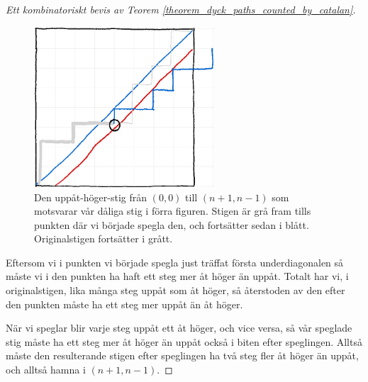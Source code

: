 \documentclass[nobib]{tufte-handout}
\begin{document}
\begin{proof}[Ett kombinatoriskt bevis av Teorem \ref{theorem_dyck_paths_counted_by_catalan}]
    \begin{figure}\label{fig:dyck_comb_proof_reflected_path}
        \centering
        \includegraphics[width = 0.6\textwidth]{graphics/dyck_combinatorial_proof_reflected_path.png}
        \caption{Den uppåt-höger-stig från $(0,0)$ till $(n+1,n-1)$ som motsvarar vår dåliga stig i förra figuren. Stigen är grå fram tills punkten där vi började spegla den, och fortsätter sedan i blått. Originalstigen fortsätter i grått.}
    \end{figure}

    Eftersom vi i punkten vi började spegla just träffat första underdiagonalen så måste vi i den punkten ha haft ett steg mer åt höger än uppåt. Totalt har vi, i originalstigen, lika många steg uppåt som åt höger, så återstoden av den efter den punkten måste ha ett steg mer uppåt än åt höger.

    När vi speglar blir varje steg uppåt ett åt höger, och vice versa, så vår speglade stig måste ha ett steg mer åt höger än uppåt också i biten efter speglingen. Alltså måste den resulterande stigen efter speglingen ha två steg fler åt höger än uppåt, och alltså hamna i $(n+1,n-1)$.


\end{proof}
\end{document}
